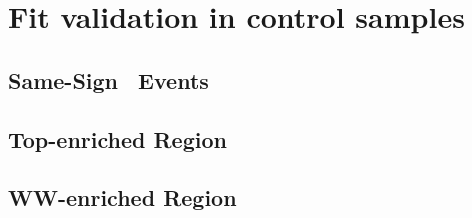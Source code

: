 \documentclass{cmspaper}
\begin{document}

\section{Fit validation in control samples}
  \label{sec:appendix_fitvalidation}
     \subsection{Same-Sign \M\M~Events}
       \label{sec:appendix_fitvalidation_ssmm}
       
     \subsection{Top-enriched Region}
       \label{sec:appendix_fitvalidation_top}
       
     \subsection{WW-enriched Region}
       \label{sec:appendix_fitvalidation_ww}
       
%       
\end{document}
